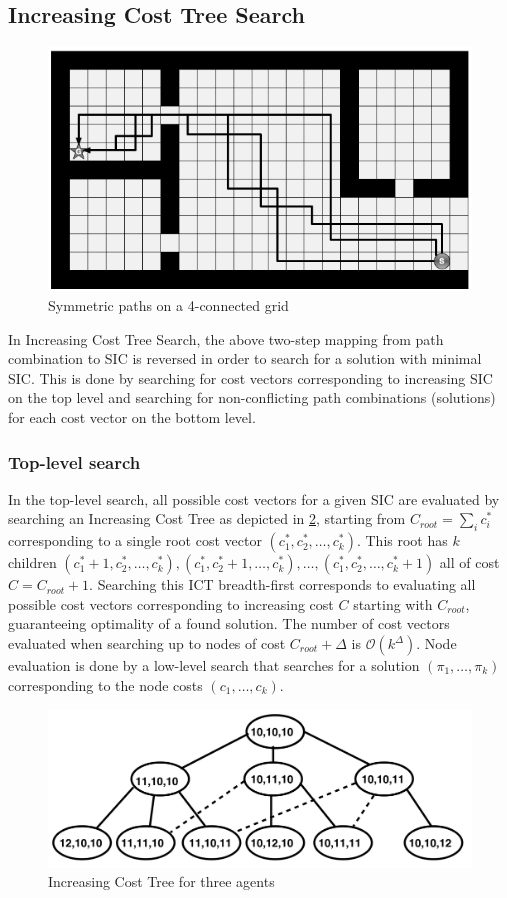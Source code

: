 \documentclass[english]{article}
\begin{document}
	\subsection{Increasing Cost Tree Search}
	\label{icts}
	\begin{figure}[t]
		\centering
		\includegraphics[width=0.4\linewidth]{img/symmetries}
		\caption{Symmetric paths on a 4-connected grid\cite{harabor2010}}
		\label{fig:symmetries}
	\end{figure}
	In Increasing Cost Tree Search\cite{sharon2011}, the above two-step mapping from path combination to SIC is reversed in order to search for a solution with minimal SIC. This is done by searching for cost vectors corresponding to increasing SIC on the top level and searching for non-conflicting path combinations (solutions) for each cost vector on the bottom level. 
	
	\subsubsection{Top-level search}
	 In the top-level search, all possible cost vectors for a given SIC are evaluated by searching an Increasing Cost Tree as depicted in \ref{fig:ict}, starting from $C_{root} = \sum_i c^*_i$ corresponding to a single root cost vector $(c^*_1,c^*_2,\ldots,c^*_k)$. This root has $k$ children $(c^*_1 + 1,c^*_2,\ldots,c^*_k),(c^*_1,c^*_2 + 1,\ldots,c^*_k),\ldots,(c^*_1,c^*_2,\ldots,c^*_k + 1)$ all of cost $C = C_{root} + 1$. Searching this ICT breadth-first corresponds to evaluating all possible cost vectors corresponding to increasing cost $C$ starting with $C_{root}$, guaranteeing optimality of a found solution. The number of cost vectors evaluated when searching up to nodes of cost $C_{root} + \Delta$ is $\mathcal{O}(k^\Delta)$. Node evaluation is done by a low-level search that searches for a solution $(\pi_1,\ldots,\pi_k)$ corresponding to the node costs $(c_1,\ldots,c_k)$.
		
	\begin{figure}[t]
		\centering
		\includegraphics[width=0.7\linewidth]{img/ict}
		\caption{Increasing Cost Tree for three agents \cite{sharon2011}}
		\label{fig:ict}
	\end{figure}
\begin{figure}

\end{figure}
\end{document}
